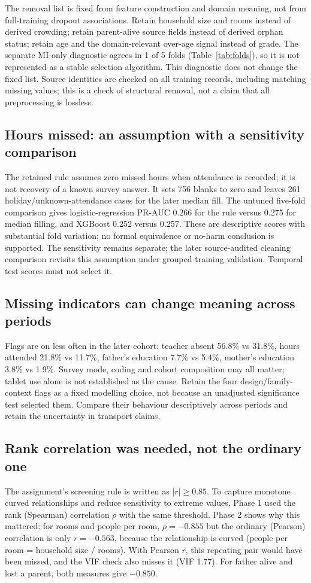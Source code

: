 \documentclass[conference,a4paper]{IEEEtran}
\begin{document}
The removal list is fixed from feature construction and domain meaning, not from full-training dropout associations. Retain household size and rooms instead of derived crowding; retain parent-alive source fields instead of derived orphan status; retain age and the domain-relevant over-age signal instead of grade. The separate MI-only diagnostic agrees in 1 of 5 folds (Table~\ref{tab:folds}), so it is not represented as a stable selection algorithm. This diagnostic does not change the fixed list. Source identities are checked on all training records, including matching missing values; this is a check of structural removal, not a claim that all preprocessing is lossless.

\subsection{\textbf{Hours missed: an assumption with a sensitivity comparison}}
The retained rule assumes zero missed hours when attendance is recorded; it is not recovery of a known survey answer. It sets 756 blanks to zero and leaves 261 holiday/unknown-attendance cases for the later median fill. The untuned five-fold comparison gives logistic-regression PR-AUC 0.266 for the rule versus 0.275 for median filling, and XGBoost 0.252 versus 0.257. These are descriptive scores with substantial fold variation; no formal equivalence or no-harm conclusion is supported. The sensitivity remains separate; the later source-audited cleaning comparison revisits this assumption under grouped training validation. Temporal test scores must not select it.

\subsection{\textbf{Missing indicators can change meaning across periods}}
Flags are on less often in the later cohort: teacher absent 56.8\% vs 31.8\%, hours attended 21.8\% vs 11.7\%, father's education 7.7\% vs 5.4\%, mother's education 3.8\% vs 1.9\%. Survey mode, coding and cohort composition may all matter; tablet use alone is not established as the cause. Retain the four design/family-context flags as a fixed modelling choice, not because an unadjusted significance test selected them. Compare their behaviour descriptively across periods and retain the uncertainty in transport claims.

\subsection{\textbf{Rank correlation was needed, not the ordinary one}}
The assignment's screening rule is written as $|r|\ge0.85$. To capture monotone curved relationships and reduce sensitivity to extreme values, Phase 1 used the rank (Spearman) correlation $\rho$ with the same threshold. Phase 2 shows why this mattered: for rooms and people per room, $\rho=-0.855$ but the ordinary (Pearson) correlation is only $r=-0.563$, because the relationship is curved (people per room = household size / rooms). With Pearson $r$, this repeating pair would have been missed, and the VIF check also misses it (VIF 1.77). For father alive and lost a parent, both measures give $-0.850$.
\end{document}
